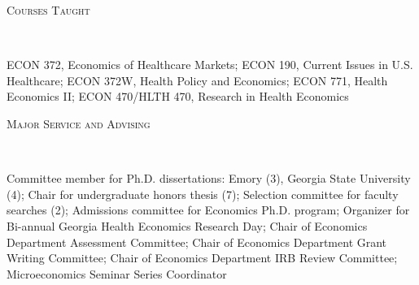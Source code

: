 \documentclass[9pt]{article}
\newenvironment{changemargin}[2]{%
  \begin{list}{}{%
    \setlength{\topsep}{0pt}%
    \setlength{\leftmargin}{#1}%
    \setlength{\rightmargin}{#2}%
    \setlength{\listparindent}{\parindent}%
    \setlength{\itemindent}{\parindent}%
    \setlength{\parsep}{\parskip}%
  }%
  \item[]}{\end{list}
}
\newcommand{\lineover}{
	\begin{changemargin}{-0.05in}{-0.05in}
		\vspace*{-8pt}
		\hrulefill \\
		\vspace*{-2pt}
	\end{changemargin}
}
\newcommand{\header}[1]{
	\begin{changemargin}{-0.5in}{-0.5in}
	\scshape{#1}\\
  	\lineover
	\end{changemargin}
}
\newenvironment{body} {
	\vspace*{-16pt}
	\begin{changemargin}{-0.25in}{-0.5in}
  }	
	{\end{changemargin}
}
\begin{document}
\header{Courses Taught}
\begin{body}
 \vspace{14pt}
 ECON 372, Economics of Healthcare Markets; ECON 190, Current Issues in U.S. Healthcare; ECON 372W, Health Policy and Economics; ECON 771, Health Economics II; ECON 470/HLTH 470, Research in Health Economics
\end{body}
\smallskip

\header{Major Service and Advising}
\begin{body}
  \vspace{14pt}
  Committee member for Ph.D. dissertations: Emory (3), Georgia State University (4); Chair for undergraduate honors thesis (7); Selection committee for faculty searches (2); Admissions committee for Economics Ph.D. program; Organizer for Bi-annual Georgia Health Economics Research Day; Chair of Economics Department Assessment Committee; Chair of Economics Department Grant Writing Committee; Chair of Economics Department IRB Review Committee; Microeconomics Seminar Series Coordinator
  \end{body}
\end{document}
